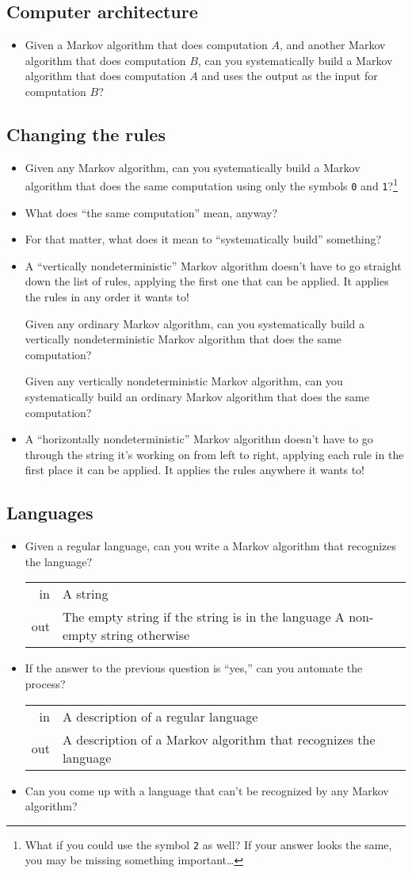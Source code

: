 \documentclass{article}
\newcommand*\proveit{\item[\manimpossiblecube]}
\newcommand*{\thinkit}{\item[\Coffeecup]}
\newcommand{\spec}[1]{{\sc #1}}
\newcommand{\str}[1]{\texttt{#1}}
\begin{document}
\subsection*{Computer architecture}
\begin{itemize}
\proveit Given a Markov algorithm that does computation $A$, and another Markov algorithm that does computation $B$, can you systematically build a Markov algorithm that does computation $A$ and uses the output as the input for computation $B$?
\end{itemize}
\subsection*{Changing the rules}
\begin{itemize}
\proveit Given any Markov algorithm, can you systematically build a Markov algorithm that does the same computation using only the symbols \str{0} and \str{1}?\footnote{What if you could use the symbol \str{2} as well? If your answer looks the same, you may be missing something important\ldots}
\thinkit What does ``the same computation'' mean, anyway?
\thinkit For that matter, what does it mean to ``systematically build'' something?
\proveit A ``vertically nondeterministic'' Markov algorithm doesn't have to go straight down the list of rules, applying the first one that can be applied. It applies the rules in any order it wants to!

Given any ordinary Markov algorithm, can you systematically build a vertically nondeterministic Markov algorithm that does the same computation?

Given any vertically nondeterministic Markov algorithm, can you systematically build an ordinary Markov algorithm that does the same computation?
\proveit A ``horizontally nondeterministic'' Markov algorithm doesn't have to go through the string it's working on from left to right, applying each rule in the first place it can be applied. It applies the rules anywhere it wants to!
\end{itemize}
\subsection*{Languages}
\begin{itemize}
\proveit
Given a regular language, can you write a Markov algorithm that recognizes the language?

\begin{tabularx}{\textwidth}{rX}
\spec{in} & A string \\
\spec{out} & The empty string if the string is in the language \newline A non-empty string otherwise
\end{tabularx}
\proveit
If the answer to the previous question is ``yes,'' can you automate the process?

\begin{tabular}{rl}
\spec{in} & A description of a regular language \\
\spec{out} & A description of a Markov algorithm that recognizes the language
\end{tabular}
\proveit Can you come up with a language that can't be recognized by any Markov algorithm?
\end{itemize}
\end{document}
